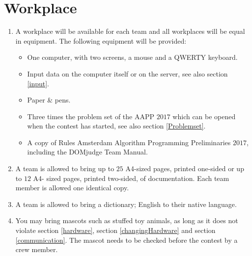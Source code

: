 \documentclass[11pt]{report}
\begin{document}
\section{Workplace}
\begin{enumerate}[label=\bfseries 4.3.\arabic*]
\item A workplace will be available for each team and all workplaces will be equal in equipment. The following equipment will be provided:
\begin{itemize}
	\item One computer, with two screens, a mouse and a QWERTY keyboard. %
	\item Input data on the computer itself or on the server, see also section \ref{input}.
	\item Paper \& pens.
	\item Three times the problem set of the AAPP $2017$ which can be opened when the contest has started, see also section \ref{Problemset}.
	\item A copy of Rules Amsterdam Algorithm Programming Preliminaries $2017$, including the DOMjudge Team Manual.
\end{itemize}
\item A team is allowed to bring up to $25$ A4-sized pages, printed one-sided or up to $12$ A4- sized pages, printed two-sided, of documentation. Each team member is allowed one identical copy.
\item A team is allowed to bring a dictionary; English to their native language.
\item You may bring mascots such as stuffed toy animals, as long as it does not violate section \ref{hardware}, section \ref{changingHardware} and section \ref{communication}. The mascot needs to be checked before the contest by a crew member.
\end{enumerate}
\end{document}
